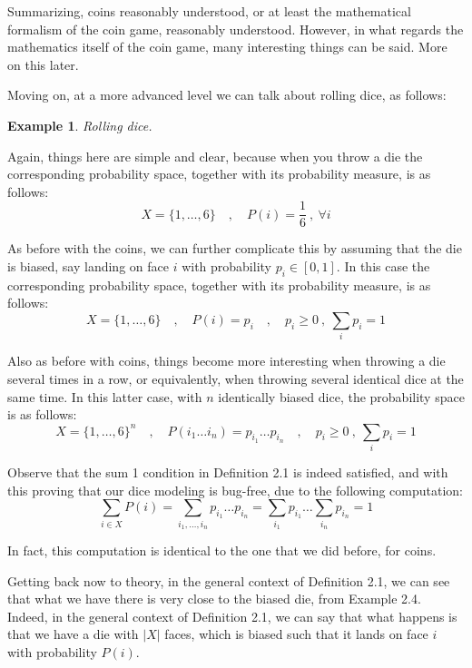 \documentclass[12pt]{amsbook}
\newtheorem{example}[theorem]{Example}
\begin{document}
Summarizing, coins reasonably understood, or at least the mathematical formalism of the coin game, reasonably understood. However, in what regards the mathematics itself of the coin game, many interesting things can be said. More on this later.

\bigskip

Moving on, at a more advanced level we can talk about rolling dice, as follows:

\begin{example}
Rolling dice.
\end{example}

Again, things here are simple and clear, because when you throw a die the corresponding probability space, together with its probability measure, is as follows:
$$X=\big\{1,\ldots,6\big\}\quad,\quad P(i)=\frac{1}{6}\ ,\ \forall i$$

As before with the coins, we can further complicate this by assuming that the die is biased, say landing on face $i$ with probability $p_i\in[0,1]$. In this case the corresponding probability space, together with its probability measure, is as follows:
$$X=\big\{1,\ldots,6\big\}\quad,\quad P(i)=p_i\quad,\quad p_i\geq0\ ,\ \sum_ip_i=1$$

Also as before with coins, things become more interesting when throwing a die several times in a row, or equivalently, when throwing several identical dice at the same time. In this latter case, with $n$ identically biased dice, the probability space is as follows:
$$X=\big\{1,\ldots,6\big\}^n\quad,\quad P(i_1\ldots i_n)=p_{i_1}\ldots p_{i_n}\quad,\quad p_i\geq0\ ,\ \sum_ip_i=1$$

Observe that the sum 1 condition in Definition 2.1 is indeed satisfied, and with this proving that our dice modeling is bug-free, due to the following computation:
$$\sum_{i\in X}P(i)
=\sum_{i_1,\ldots,i_n}p_{i_1}\ldots p_{i_n}
=\sum_{i_1}p_{i_1}\ldots\sum_{i_n}p_{i_n}
=1$$

In fact, this computation is identical to the one that we did before, for coins.

\bigskip

Getting back now to theory, in the general context of Definition 2.1, we can see that what we have there is very close to the biased die, from Example 2.4. Indeed, in the general context of Definition 2.1, we can say that what happens is that we have a die with $|X|$ faces, which is biased such that it lands on face $i$ with probability $P(i)$. 

\bigskip
\end{document}
